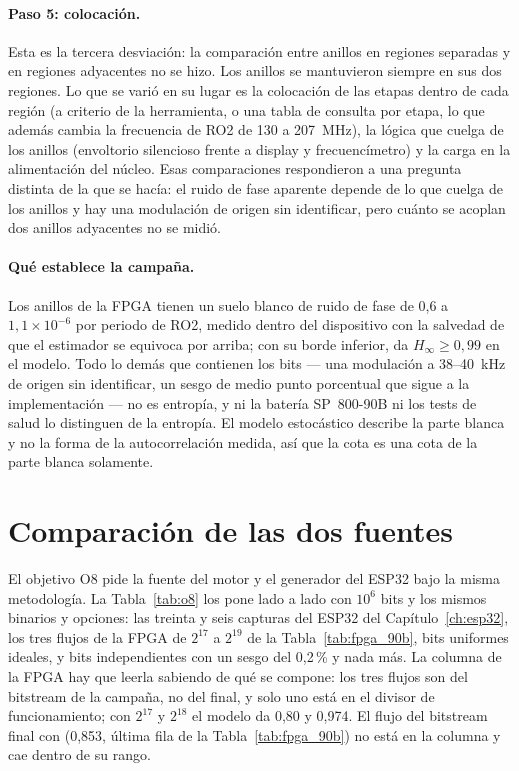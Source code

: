 \paragraph{Paso 5: colocación.} Esta es la tercera desviación: la
comparación entre anillos en regiones separadas y en regiones adyacentes
no se hizo. Los anillos se mantuvieron siempre en sus dos regiones. Lo
que se varió en su lugar es la colocación de las etapas dentro de cada
región (a criterio de la herramienta, o una tabla de consulta por etapa,
lo que además cambia la frecuencia de RO2 de 130 a 207~MHz), la lógica
que cuelga de los anillos (envoltorio silencioso frente a display y
frecuencímetro) y la carga en la alimentación del núcleo. Esas
comparaciones respondieron a una pregunta distinta de la que se hacía: el
ruido de fase aparente depende de lo que cuelga de los anillos y hay una
modulación de origen sin identificar, pero cuánto se acoplan dos anillos
adyacentes no se midió.

\paragraph{Qué establece la campaña.} Los anillos de la \ac{FPGA} tienen
un suelo blanco de ruido de fase de 0,6 a $1{,}1\times10^{-6}$ por
periodo de RO2, medido dentro del dispositivo con la salvedad de que el
estimador se equivoca por arriba; con su borde inferior,  da
$H_\infty \ge 0{,}99$ en el modelo. Todo lo demás que contienen los bits
--- una modulación a 38--40~kHz de origen sin identificar, un sesgo
de medio punto porcentual que sigue a la implementación --- no es
entropía, y ni la batería SP~800-90B ni los tests de salud lo distinguen
de la entropía. El modelo estocástico describe la parte blanca y no la
forma de la autocorrelación medida, así que la cota es una cota de la
parte blanca solamente.

\section{Comparación de las dos fuentes}
\label{sec:o8}

El objetivo O8 pide la fuente del motor y el generador del ESP32 bajo la
misma metodología. La Tabla~\ref{tab:o8} los pone lado a lado con $10^6$
bits y los mismos binarios y opciones: las treinta y seis capturas del
ESP32 del Capítulo~\ref{ch:esp32}, los tres flujos de la \ac{FPGA} de
$2^{17}$ a $2^{19}$ de la Tabla~\ref{tab:fpga_90b}, bits uniformes
ideales, y bits independientes con un sesgo del 0,2\,\% y nada más. La
columna de la \ac{FPGA} hay que leerla sabiendo de qué se compone: los
tres flujos son del bitstream de la campaña, no del final, y solo uno
está en el divisor de funcionamiento; con $2^{17}$ y $2^{18}$ el modelo
da 0,80 y 0,974. El flujo del bitstream final con  (0,853, última
fila de la Tabla~\ref{tab:fpga_90b}) no está en la columna y cae dentro
de su rango.

